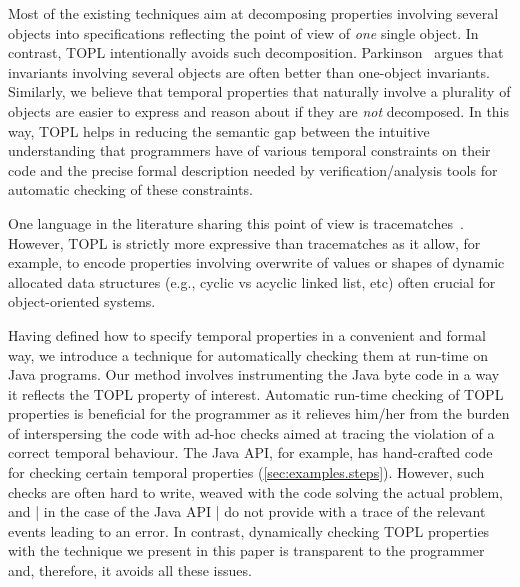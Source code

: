 \documentclass{llncs} %
\begin{document}
Most of the existing techniques aim at decomposing properties involving several objects into specifications reflecting the point of view of {\em one} single object.
In contrast, TOPL intentionally avoids such decomposition.
Parkinson~\cite{parkinson-iwaco2007} argues that invariants involving several objects are often better than one-object invariants. 
Similarly, we believe that temporal properties that naturally involve a plurality of objects are easier to express and reason about if they are \emph{not} decomposed. 
In this way,  
TOPL helps in  reducing the semantic gap between 
the intuitive understanding that programmers have of various temporal constraints on their code 
and the precise formal description needed by verification/analysis tools for automatic checking of these constraints.



One language in the literature sharing this point of view is tracematches~\cite{DBLP:conf/oopsla/AllanACHKLMSST05}. However, TOPL is strictly more expressive than tracematches as it allow, for example, to encode properties involving overwrite of values or shapes of dynamic allocated data structures (e.g., cyclic vs acyclic linked list, etc) often crucial for object-oriented systems.


Having defined how to specify temporal properties in a convenient  and formal way, 
we introduce a technique for automatically checking them at run-time on Java programs.
Our method involves instrumenting the Java byte code in a way it reflects the TOPL property of interest.
Automatic run-time checking of TOPL properties is beneficial for the programmer as
 it relieves him/her from the burden of 
interspersing the code with ad-hoc checks  aimed at tracing the violation of a correct temporal behaviour.
The Java API, for example, has hand-crafted code for checking certain temporal properties (\autoref{sec:examples.steps}).
However, such checks are often hard to write, weaved with the code solving the actual problem, and | in the case of the Java API |  do not provide with a trace of the relevant events leading to an error.
In contrast, dynamically checking TOPL properties  with the technique we present in this paper is transparent to the programmer and, therefore,  it avoids all these issues.
\end{document}
